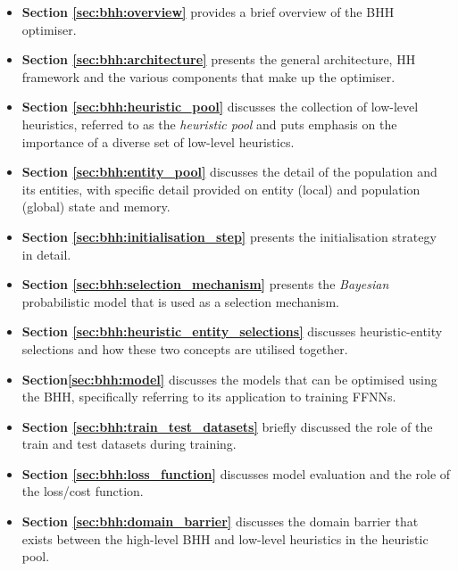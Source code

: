 \begin{itemize}
      \item \textbf{Section \ref{sec:bhh:overview}} provides a brief overview of the \Ac{BHH} optimiser.

      \item \textbf{Section \ref{sec:bhh:architecture}} presents the general architecture, \Ac{HH} framework and the various components that make up the optimiser.

      \item \textbf{Section \ref{sec:bhh:heuristic_pool}} discusses the collection of low-level heuristics, referred to as the \textit{heuristic pool} and puts emphasis on the importance of a diverse set of low-level heuristics.

      \item \textbf{Section \ref{sec:bhh:entity_pool}} discusses the detail of the population and its entities, with specific detail provided on entity (local) and population (global) state and memory.

      \item \textbf{Section \ref{sec:bhh:initialisation_step}} presents the initialisation strategy in detail.

      \item \textbf{Section \ref{sec:bhh:selection_mechanism}} presents the \textit{Bayesian} probabilistic model that is used as a selection mechanism.

      \item \textbf{Section \ref{sec:bhh:heuristic_entity_selections}} discusses heuristic-entity selections and how these two concepts are utilised together.

      \item \textbf{Section\ref{sec:bhh:model}} discusses the models that can be optimised using the \Ac{BHH}, specifically referring to its application to training \acp{FFNN}.

      \item \textbf{Section \ref{sec:bhh:train_test_datasets}} briefly discussed the role of the train and test datasets during training.

      \item \textbf{Section \ref{sec:bhh:loss_function}} discusses model evaluation and the role of the loss/cost function.

      \item \textbf{Section \ref{sec:bhh:domain_barrier}} discusses the domain barrier that exists between the high-level \ac{BHH} and low-level heuristics in the heuristic pool.


\end{itemize}
